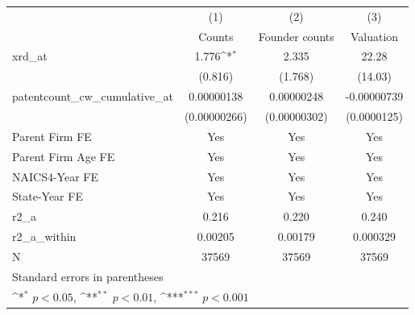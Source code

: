 {
\def\sym#1{\ifmmode^{#1}\else\(^{#1}\)\fi}
\begin{tabular}{l*{3}{c}}
\hline\hline
            &\multicolumn{1}{c}{(1)}&\multicolumn{1}{c}{(2)}&\multicolumn{1}{c}{(3)}\\
            &\multicolumn{1}{c}{Counts}&\multicolumn{1}{c}{Founder counts}&\multicolumn{1}{c}{Valuation}\\
\hline
xrd\_at      &       1.776\sym{*}  &       2.335         &       22.28         \\
            &     (0.816)         &     (1.768)         &     (14.03)         \\
[1em]
patentcount\_cw\_cumulative\_at&  0.00000138         &  0.00000248         & -0.00000739         \\
            &(0.00000266)         &(0.00000302)         & (0.0000125)         \\
[1em]
Parent Firm FE&         Yes         &         Yes         &         Yes         \\
[1em]
Parent Firm Age FE&         Yes         &         Yes         &         Yes         \\
[1em]
NAICS4-Year FE&         Yes         &         Yes         &         Yes         \\
[1em]
State-Year FE&         Yes         &         Yes         &         Yes         \\
\hline
r2\_a        &       0.216         &       0.220         &       0.240         \\
r2\_a\_within &     0.00205         &     0.00179         &    0.000329         \\
N           &       37569         &       37569         &       37569         \\
\hline\hline
\multicolumn{4}{l}{\footnotesize Standard errors in parentheses}\\
\multicolumn{4}{l}{\footnotesize \sym{*} \(p<0.05\), \sym{**} \(p<0.01\), \sym{***} \(p<0.001\)}\\
\end{tabular}
}
